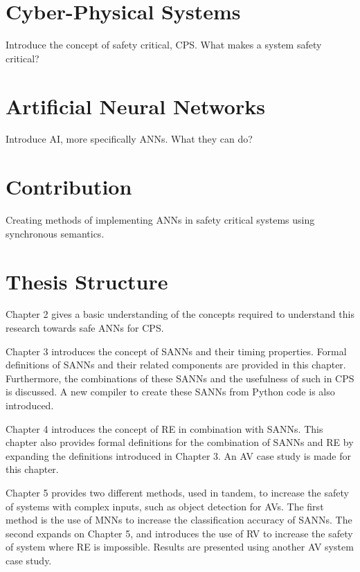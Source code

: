 \section{Cyber-Physical Systems}
Introduce the concept of safety critical, CPS. What makes a system safety critical?

\section{Artificial Neural Networks}
Introduce AI, more specifically ANNs. What they can do?

\section{Contribution}
Creating methods of implementing ANNs in safety critical systems using synchronous semantics.

\section{Thesis Structure}
Chapter 2 gives a basic understanding of the concepts required to understand this research towards safe \acp{ANN} for \ac{CPS}.

Chapter 3 introduces the concept of \acfp{SANN} and their timing properties.
Formal definitions of \acp{SANN} and their related components are provided in this chapter.
Furthermore, the combinations of these \acp{SANN} and the usefulness of such in \ac{CPS} is discussed.
A new compiler to create these \acp{SANN} from Python code is also introduced.

Chapter 4 introduces the concept of \acf{RE} in combination with \acp{SANN}. 
This chapter also provides formal definitions for the combination of \acp{SANN} and \ac{RE} by expanding the definitions introduced in Chapter 3.
An \acf{AV} case study is made for this chapter.

Chapter 5 provides two different methods, used in tandem, to increase the safety of systems with complex inputs, such as object detection for \acp{AV}.
The first method is the use of \acp{MNN} to increase the classification accuracy of \acp{SANN}.
The second expands on Chapter 5, and introduces the use of \acf{RV} to increase the safety of system where \ac{RE} is impossible.
Results are presented using another \ac{AV} system case study.

